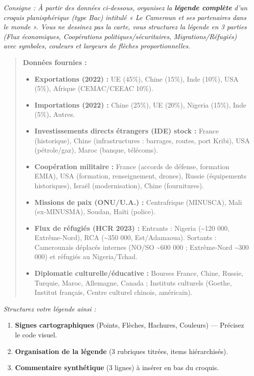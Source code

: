 \documentclass[11pt]{article}
\begin{document}
\begin{exercice}
\emph{Consigne : À partir des données ci-dessous, organisez la \textbf{légende complète} d'un croquis planisphérique (type Bac) intitulé « Le Cameroun et ses partenaires dans le monde ». Vous ne dessinez pas la carte, vous structurez la légende en 3 parties (Flux économiques, Coopérations politiques/sécuritaires, Migrations/Réfugiés) avec symboles, couleurs et largeurs de flèches proportionnelles.}

\begin{quote}
\textbf{Données fournies :}
\begin{itemize}
    \item \textbf{Exportations (2022) :} UE (45\%), Chine (15\%), Inde (10\%), USA (5\%), Afrique (CEMAC/CEEAC 10\%).
    \item \textbf{Importations (2022) :} Chine (25\%), UE (20\%), Nigeria (15\%), Inde (5\%), Autres.
    \item \textbf{Investissements directs étrangers (IDE) stock :} France (historique), Chine (infrastructures : barrages, routes, port Kribi), USA (pétrole/gaz), Maroc (banque, télécoms).
    \item \textbf{Coopération militaire :} France (accords de défense, formation EMIA), USA (formation, renseignement, drones), Russie (équipements historiques), Israël (modernisation), Chine (fournitures).
    \item \textbf{Missions de paix (ONU/U.A.) :} Centrafrique (MINUSCA), Mali (ex-MINUSMA), Soudan, Haïti (police).
    \item \textbf{Flux de réfugiés (HCR 2023) :} Entrants : Nigeria (\textasciitilde 120 000, Extrême-Nord), RCA (\textasciitilde 350 000, Est/Adamaoua). Sortants : Camerounais déplacés internes (NO/SO \textasciitilde 600 000 ; Extrême-Nord \textasciitilde 300 000) et réfugiés au Nigeria/Tchad.
    \item \textbf{Diplomatie culturelle/éducative :} Bourses France, Chine, Russie, Turquie, Maroc, Allemagne, Canada ; Instituts culturels (Goethe, Institut français, Centre culturel chinois, américain).
\end{itemize}
\end{quote}
\emph{Structurez votre légende ainsi :}
\begin{enumerate}
    \item \textbf{Signes cartographiques} (Points, Flèches, Hachures, Couleurs) — Précisez le code visuel.
    \item \textbf{Organisation de la légende} (3 rubriques titrées, items hiérarchisés).
    \item \textbf{Commentaire synthétique} (3 lignes) à insérer en bas du croquis.
\end{enumerate}
\end{exercice}
\end{document}
